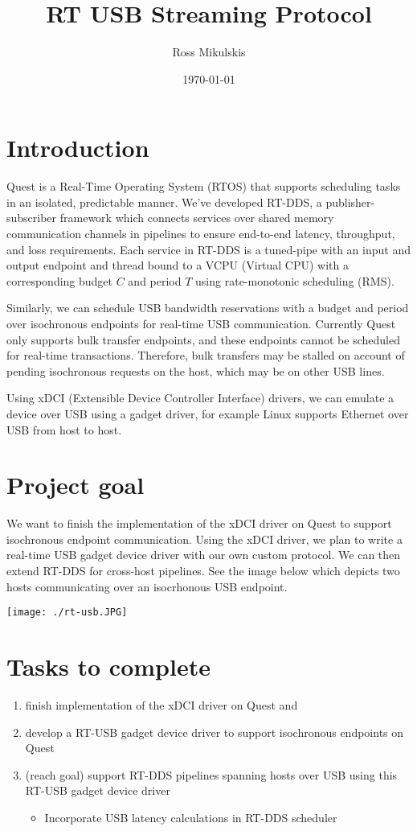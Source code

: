 \documentclass[11pt]{article}
\author{Ross Mikulskis}
\date{\today}
\title{RT USB Streaming Protocol}
\begin{document}
\maketitle
\tableofcontents

\section{Introduction}
\label{sec:orga16d977}
Quest is a Real-Time Operating System (RTOS) that supports scheduling tasks
in an isolated, predictable manner. We've developed RT-DDS, a
publisher-subscriber framework which connects services over shared
memory communication channels in pipelines to ensure end-to-end
latency, throughput, and loss requirements. Each service in RT-DDS is
a tuned-pipe with an input and output endpoint and thread bound to a
VCPU (Virtual CPU) with a corresponding budget \(C\) and period \(T\)
using rate-monotonic scheduling (RMS).

Similarly, we can schedule USB bandwidth reservations with a budget
and period over isochronous endpoints for real-time USB
communication. Currently Quest only supports bulk transfer endpoints,
and these endpoints cannot be scheduled for real-time
transactions. Therefore, bulk transfers may be stalled on account of
pending isochronous requests on the host, which may be on other USB
lines.

Using xDCI (Extensible Device Controller Interface) drivers, we can
emulate a device over USB using a gadget driver, for example Linux
supports Ethernet over USB from host to host.
\section{Project goal}
\label{sec:org3aa0e6f}
We want to finish the implementation of the xDCI driver on Quest to support
isochronous endpoint communication. Using the xDCI driver, we plan to write a
real-time USB gadget device driver with our own custom protocol. We can then
extend RT-DDS for cross-host pipelines. See the image below which depicts
two hosts communicating over an isocrhonous USB endpoint.
\begin{center}
\texttt{[image: ./rt-usb.JPG]}
\end{center}
\section{Tasks to complete}
\label{sec:org736c52a}
\begin{enumerate}
\item finish implementation of the xDCI driver on Quest and
\item develop a RT-USB gadget device driver to support isochronous endpoints
on Quest
\item (reach goal) support RT-DDS pipelines spanning hosts over USB using this
RT-USB gadget device driver
\begin{itemize}
\item Incorporate USB latency calculations in RT-DDS scheduler
\end{itemize}
\end{enumerate}
\end{document}
